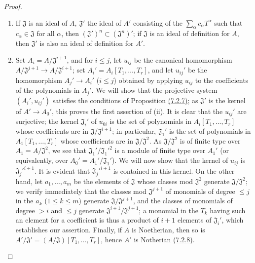 \begin{proof}
\label{proof-0.7.5.4}
\medskip\noindent
\begin{enumerate}[label=(\roman*)]
  \item If $\mathfrak{J}$ is an ideal of $A$, $\mathfrak{J}'$ the ideal of $A'$
    consisting of the $\sum_\alpha c_\alpha T^\alpha$ such that $c_\alpha\in\mathfrak{J}$
    for all $\alpha$, then $(\mathfrak{J}')^n\subset(\mathfrak{J}^n)'$; if $\mathfrak{J}$
    is an ideal of definition for $A$, then $\mathfrak{J}'$ is also an ideal of definition
    for $A'$.
  \item Set $A_i=A/\mathfrak{J}^{i+1}$, and for $i\leqslant j$, let $u_{ij}$ be the
    canonical homomorphism $A/\mathfrak{J}^{j+1}\to A/\mathfrak{J}^{i+1}$; set
    $A_i'=A_i[T_1,\dots,T_r]$, and let $u_{ij}'$ be the homomorphism $A_j'\to A_i'$
    ($i\leqslant j$) obtained by applying $u_{ij}$ to the coefficients of the polynomials
    in $A_j'$. We will show that the projective system $(A_i',u_{ij}')$ satisfies the conditions
    of Proposition \hyperref[0.7.2.7]{(7.2.7)}; as $\mathfrak{J}'$ is the kernel of
    $A'\to A_0'$, this proves the first assertion of (ii). It is clear that the $u_{ij}'$ are
    surjective; the kernel $\mathfrak{J}_i'$ of $u_{0i}$ is the set of polynomials in
    $A_i[T_1,\dots,T_r]$ whose coefficients are in $\mathfrak{J}/\mathfrak{J}^{i+1}$; in
    particular, $\mathfrak{J}_1'$ is the set of polynomials in $A_1[T_1,\dots,T_r]$ whose
    coefficients are in $\mathfrak{J}/\mathfrak{J}^2$. As $\mathfrak{J}/\mathfrak{J}^2$ is
    of finite type over $A_1=A/\mathfrak{J}^2$, we see that $\mathfrak{J}_1'/{\mathfrak{J}_1'}^2$
    is a module of finite type over $A_1'$ (or equivalently, over $A_0'=A_1'/\mathfrak{J}_1'$).
    We will now show that the kernel of $u_{ij}$ is ${\mathfrak{J}_j'}^{i+1}$. It is evident that
    ${\mathfrak{J}_j'}^{i+1}$ is contained in this kernel. On the other hand, let $a_1,\dots,a_m$
    be the elements of $\mathfrak{J}$ whose classes mod $\mathfrak{J}^2$ generate
    $\mathfrak{J}/\mathfrak{J}^2$; we verify immediately that the classes mod $\mathfrak{J}^{j+1}$
    of monomials of degree $\leqslant j$ in the $a_k$ ($1\leqslant k\leqslant m$) generate
    $\mathfrak{J}/\mathfrak{J}^{j+1}$, and the classes of monomials of degree $>i$ and
    $\leqslant j$ generate $\mathfrak{J}^{i+1}/\mathfrak{J}^{j+1}$; a monomial in the $T_k$
    having such an element for a coefficient is thus a product of $i+1$ elements of
    $\mathfrak{J}_i'$, which establishes our assertion. Finally, if $A$ is Noetherian, then so
    is $A'/\mathfrak{J}'=(A/\mathfrak{J})[T_1,\dots,T_r]$, hence $A'$ is Notherian
    \hyperref[0.7.2.8]{(7.2.8)}.
\end{enumerate}
\end{proof}


